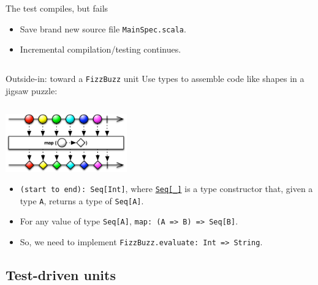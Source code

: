 \begin{frame}[fragile]{The test compiles, but fails}
  
  \begin{itemize}
  \item Save brand new source file \texttt{MainSpec.scala}.
  \item Incremental compilation/testing continues.
  \end{itemize}

  \inputminted{console}{testQuick2.console}
\end{frame}

\begin{frame}[fragile]{Outside-in: toward a \texttt{FizzBuzz} unit}
  Use types to assemble code like shapes in a jigsaw puzzle:

  \inputminted{scala}{Main4.scala}

  \begin{center}
    \includegraphics[height=2.5cm]{map.png}
  \end{center}

  \begin{itemize}
  \item \texttt{(start to end): Seq[Int]}, where \href{http://www.scala-lang.org/api/2.11.0/index.html\#scala.collection.Seq}{\texttt{Seq[_]}} is a \alert{type constructor} that, given a type \texttt{A}, returns a type of \texttt{Seq[A]}.
  \item For any value of type \texttt{Seq[A]}, \texttt{map: (A => B) => Seq[B]}.
  \item So, we need to implement \texttt{FizzBuzz.evaluate: Int => String}.
  \end{itemize}
\end{frame}

\subsection{Test-driven units}

